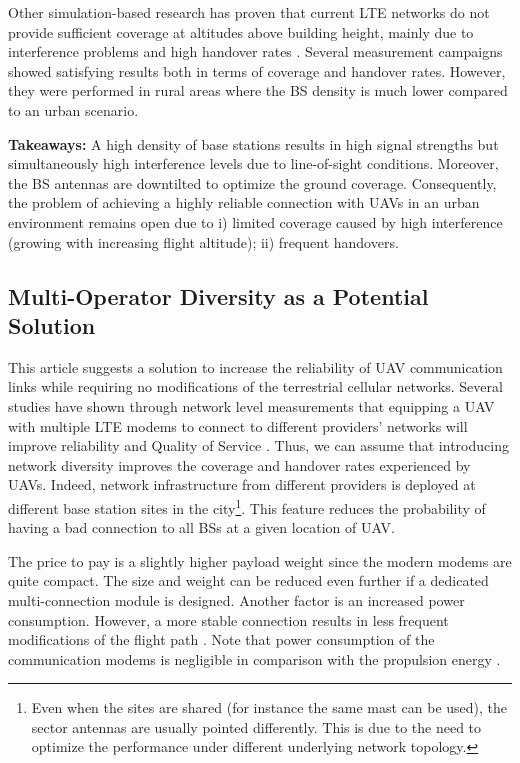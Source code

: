 Other simulation-based research has proven that current LTE networks do not provide sufficient coverage at altitudes above building height, mainly due to interference problems \cite{colpaert2018aerial} and high handover rates \cite{colpaert2020beamforming}. Several measurement campaigns \cite{gharib2021exhaustive, Fakhreddine2019HandoverCF} showed satisfying results both in terms of coverage and handover rates. However, they were performed in rural areas where the BS density is much lower compared to an urban scenario. 

\textbf{Takeaways:} A high density of base stations results in high signal strengths but simultaneously high interference levels due to line-of-sight conditions. Moreover, the BS antennas are downtilted to optimize the ground coverage. Consequently, the problem of achieving a highly reliable connection with UAVs in an urban environment remains open due to i) limited coverage caused by high interference (growing with increasing flight altitude); ii) frequent handovers. 
\subsection{Multi-Operator Diversity as a Potential Solution}
This article suggests a solution to increase the reliability of UAV communication links while requiring no modifications of the terrestrial cellular networks. Several studies have shown through network level measurements that equipping a UAV with multiple LTE modems to connect to different providers' networks will improve reliability and Quality of Service \cite{amorim2019improve,sae2020reliability,bacco2022airtoground}. Thus, we can assume that introducing network diversity improves the coverage and handover rates experienced by UAVs. Indeed, network infrastructure from different providers is deployed at different base station sites in the city\footnote{Even when the sites are shared (for instance the same mast can be used), the sector antennas are usually pointed differently. This is due to the need to optimize the performance under different underlying network topology.}. This feature reduces the probability of having a bad connection to all BSs at a given location of UAV. 

The price to pay is a slightly higher payload weight since the modern modems are quite compact. The size and weight can be reduced even further if a dedicated multi-connection module is designed. Another factor is an increased power consumption. However, a more stable connection results in less frequent modifications of the flight path \cite{7888557, Sibren19}. Note that power consumption of the communication modems is negligible in comparison with the propulsion energy \cite{7888557}.
